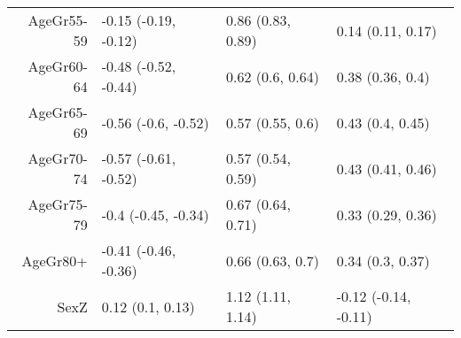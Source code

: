 \begin{table}[ht]
\begin{tabular}{rlll}
  AgeGr55-59 & -0.15 (-0.19, -0.12) & 0.86 (0.83, 0.89) & 0.14 (0.11, 0.17) \\ 
  AgeGr60-64 & -0.48 (-0.52, -0.44) & 0.62 (0.6, 0.64) & 0.38 (0.36, 0.4) \\ 
  AgeGr65-69 & -0.56 (-0.6, -0.52) & 0.57 (0.55, 0.6) & 0.43 (0.4, 0.45) \\ 
  AgeGr70-74 & -0.57 (-0.61, -0.52) & 0.57 (0.54, 0.59) & 0.43 (0.41, 0.46) \\ 
  AgeGr75-79 & -0.4 (-0.45, -0.34) & 0.67 (0.64, 0.71) & 0.33 (0.29, 0.36) \\ 
  AgeGr80+ & -0.41 (-0.46, -0.36) & 0.66 (0.63, 0.7) & 0.34 (0.3, 0.37) \\ 
  SexZ & 0.12 (0.1, 0.13) & 1.12 (1.11, 1.14) & -0.12 (-0.14, -0.11) \\ 
   \hline
\end{tabular}
\end{table}

